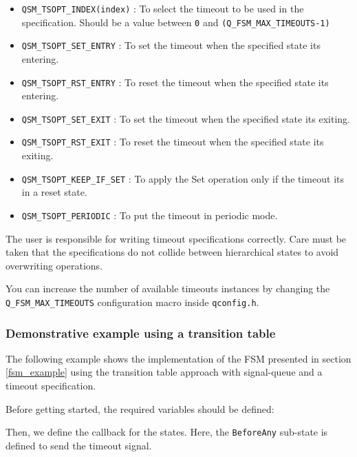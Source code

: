\begin{itemize}
    \item \lstinline{QSM_TSOPT_INDEX(index)} : To select the timeout to be used in the specification. Should be a value between \lstinline{0} and \lstinline{(Q_FSM_MAX_TIMEOUTS-1)}
    \item \lstinline{QSM_TSOPT_SET_ENTRY} : To set the timeout when the specified state its entering.
    \item \lstinline{QSM_TSOPT_RST_ENTRY} :  To reset the timeout when the specified state its entering.
    \item \lstinline{QSM_TSOPT_SET_EXIT} : To set the timeout when the specified state its exiting.
    \item \lstinline{QSM_TSOPT_RST_EXIT} : To reset the timeout when the specified state its exiting.
    \item \lstinline{QSM_TSOPT_KEEP_IF_SET} : To apply the Set operation only if the timeout its in a reset state.
    \item \lstinline{QSM_TSOPT_PERIODIC} : To put the timeout in periodic mode.
\end{itemize}

\begin{tcolorbox}
\HandRight The user is responsible for writing timeout specifications correctly. Care must be taken that the specifications do not collide between hierarchical states to avoid overwriting operations.
\end{tcolorbox}

\begin{tcolorbox}
\HandRight You can increase the number of available timeouts instances by changing the \lstinline{Q_FSM_MAX_TIMEOUTS} configuration macro inside \lstinline{qconfig.h}. 
\end{tcolorbox}

\subsubsection{Demonstrative example using a transition table}
The following example shows the implementation of the FSM presented in section \ref{fsm_example} using the transition table approach with signal-queue and a timeout specification.

Before getting started, the required variables should be defined: 
\medskip



Then, we define the callback for the states. Here, the \lstinline{BeforeAny} sub-state is defined to send the timeout signal. 
\medskip

